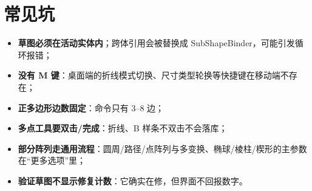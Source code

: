 
\section{常见坑}

\begin{itemize}
  \item \textbf{草图必须在活动实体内}；跨体引用会被替换成 SubShapeBinder，可能引发循环报错；
  \item \textbf{没有 M 键}：桌面端的折线模式切换、尺寸类型轮换等快捷键在移动端不存在；
  \item \textbf{正多边形边数固定}：命令只有 3--8 边；
  \item \textbf{多点工具要双击/完成}：折线、B 样条不双击不会落库；
  \item \textbf{部分阵列走通用流程}：圆周/路径/点阵列与多变换、椭球/棱柱/楔形的主参数在“更多选项”里；
  \item \textbf{验证草图不显示修复计数}：它确实在修，但界面不回报数字。
\end{itemize}
